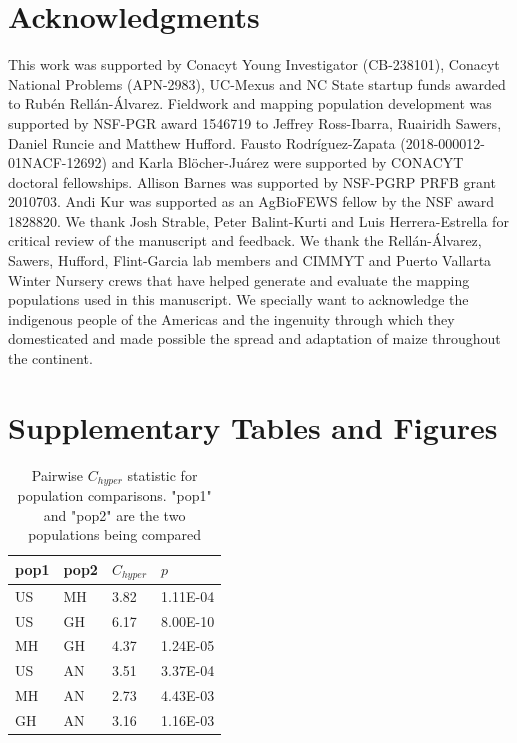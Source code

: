 \documentclass[9pt,twocolumn,twoside,lineno]{BioRxiv}
\begin{document}
\section{Acknowledgments}
This work was supported by Conacyt Young Investigator (CB-238101), Conacyt National Problems (APN-2983), UC-Mexus and NC State startup funds awarded to Rubén Rellán-Álvarez. 
Fieldwork and mapping population development was supported by NSF-PGR award 1546719 to Jeffrey Ross-Ibarra, Ruairidh Sawers, Daniel Runcie and Matthew Hufford.  
Fausto Rodríguez-Zapata (2018-000012-01NACF-12692) and Karla Blöcher-Juárez were supported by CONACYT doctoral fellowships.
Allison Barnes was supported by NSF-PGRP PRFB grant 2010703. 
Andi Kur was supported as an AgBioFEWS fellow by the NSF award 1828820.
We thank Josh Strable, Peter Balint-Kurti and Luis Herrera-Estrella for critical review of the manuscript and feedback. 
We thank the Rellán-Álvarez, Sawers, Hufford, Flint-Garcia lab members and CIMMYT and Puerto Vallarta Winter Nursery crews that have helped generate and evaluate the mapping populations used in this manuscript.
We specially want to acknowledge the indigenous people of the Americas and the  ingenuity through which they domesticated and made possible the spread and adaptation of maize throughout the continent. 
\label{sec:acknowledgments}

\typeout{}


\clearpage

\onecolumn

\section*{Supplementary Tables and Figures}

\begin{table}[h!]

\begin{tabular}{@{}llll@{}}
\toprule
pop1 & pop2 & $C_{hyper}$   & $p$  \\ \midrule
US   & MH   & 3.82 & 1.11E-04 \\
US   & GH   & 6.17 & 8.00E-10 \\
MH   & GH   & 4.37 & 1.24E-05 \\
US   & AN   & 3.51 & 3.37E-04 \\
MH   & AN   & 2.73 & 4.43E-03 \\
GH   & AN   & 3.16 & 1.16E-03 \\ \bottomrule
\end{tabular}
\label{tab:table1}
\caption{Pairwise $C_{hyper}$ statistic for population comparisons. "pop1" and "pop2" are the two populations being compared}
\end{table}
\end{document}
